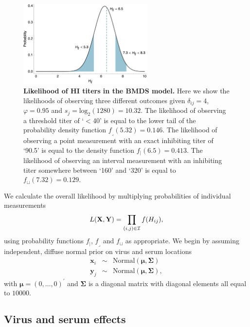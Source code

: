 \documentclass[11pt,oneside,letterpaper]{article}
\newcommand{\virus}{\mathbf{x}}						%
\newcommand{\serum}{\mathbf{y}}						%
\newcommand{\viruses}{\mathbf{X}}					%
\newcommand{\sera}{\mathbf{Y}}						%
\newcommand{\se}{s}									%
\newcommand{\point}{f_{\scriptscriptstyle \vert}}	%
\newcommand{\threshold}{f_{\textstyle \lrcorner}}	%
\newcommand{\interval}{f_{\sqcup}}					%
\newcommand{\mdssd}{\varphi}						%
\begin{document}
\begin{figure}[tb]
	\centering		
	\includegraphics[width=0.6\textwidth]{figures/hij_likelihood}
	\caption{\textbf{Likelihood of HI titers in the BMDS model.} 
	Here we show the likelihoods of observing three different outcomes given $\delta_{ij} = 4$, $\mdssd = 0.95$ and $\se_j = \mathrm{log}_2 (1280) = 10.32$.  
	The likelihood of observing a threshold titer of `$<$40' is equal to the lower tail of the probability density function $\threshold(5.32) = 0.146$.
	The likelihood of observing a point measurement with an exact inhibiting titer of `90.5' is equal to the density function $\point(6.5) = 0.413$.
	The likelihood of observing an interval measurement with an inhibiting titer somewhere between `160' and `320' is equal to $\interval(7.32) = 0.129.$
	} 
	\label{hij_likelihood} 
\end{figure}

We calculate the overall likelihood by multiplying probabilities of individual measurements
\begin{equation} 
	L(\viruses,\sera) = \prod_{(i,j) \in \cal I} f(H_{ij}),
\end{equation}
using probability functions $\point$, $\threshold$ and $\interval$ as appropriate.
We begin by assuming independent, diffuse normal prior on virus and serum locations
\begin{eqnarray}
	\virus_i &\sim& \mathrm{Normal}(\boldsymbol{\mu},\boldsymbol{\Sigma}) \nonumber \\
	\serum_j &\sim& \mathrm{Normal}(\boldsymbol{\mu},\boldsymbol{\Sigma}),
\end{eqnarray}
with $\boldsymbol{\mu} = (0,\ldots,0)^{\prime}$ and $\boldsymbol{\Sigma}$ is a diagonal matrix with diagonal elements all equal to $10000$.

\subsection*{Virus and serum effects}
\end{document}
